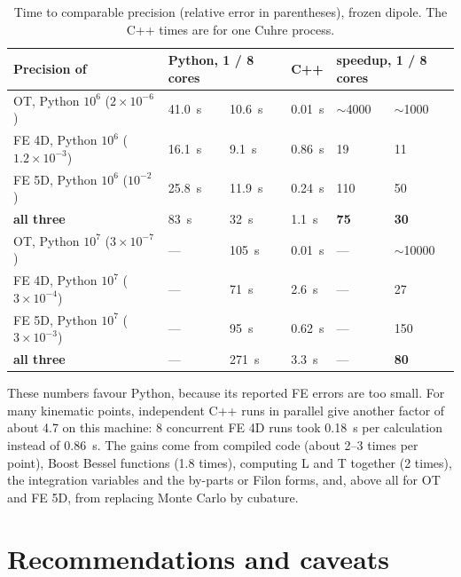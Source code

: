 \documentclass[11pt,a4paper]{article}
\begin{document}
\begin{table}[ht]
  \centering
  \footnotesize
  \setlength{\tabcolsep}{3.5pt}
  \begin{tabular}{llllll}
    \toprule
    Precision of & \multicolumn{2}{l}{Python, 1 / 8 cores} & C++ & \multicolumn{2}{l}{speedup, 1 / 8 cores} \\
    \midrule
    OT, Python $10^6$ ($2\times10^{-6}$)      & 41.0~s & 10.6~s & 0.01~s & $\sim$4000 & $\sim$1000 \\
    FE 4D, Python $10^6$ ($1.2\times10^{-3}$) & 16.1~s & 9.1~s  & 0.86~s & 19 & 11 \\
    FE 5D, Python $10^6$ ($10^{-2}$)          & 25.8~s & 11.9~s & 0.24~s & 110 & 50 \\
    \textbf{all three}                        & 83~s   & 32~s   & 1.1~s  & \textbf{75} & \textbf{30} \\
    \midrule
    OT, Python $10^7$ ($3\times10^{-7}$)      & --- & 105~s & 0.01~s & --- & $\sim$10000 \\
    FE 4D, Python $10^7$ ($3\times10^{-4}$)   & --- & 71~s  & 2.6~s  & --- & 27 \\
    FE 5D, Python $10^7$ ($3\times10^{-3}$)   & --- & 95~s  & 0.62~s & --- & 150 \\
    \textbf{all three}                        & --- & 271~s & 3.3~s  & --- & \textbf{80} \\
    \bottomrule
  \end{tabular}
  \caption{Time to comparable precision (relative error in parentheses), frozen
    dipole. The C++ times are for one Cuhre process.}
  \label{tab:speed}
\end{table}

These numbers favour Python, because its reported FE errors are too small. For
many kinematic points, independent C++ runs in parallel give another factor of
about 4.7 on this machine: 8 concurrent FE 4D runs took 0.18~s per calculation
instead of 0.86~s. The gains come from compiled code (about 2--3 times per
point), Boost Bessel functions (1.8 times), computing L and T together (2 times),
the integration variables and the by-parts or Filon forms, and, above all for OT
and FE 5D, from replacing Monte Carlo by cubature.

\section{Recommendations and caveats}
\end{document}
